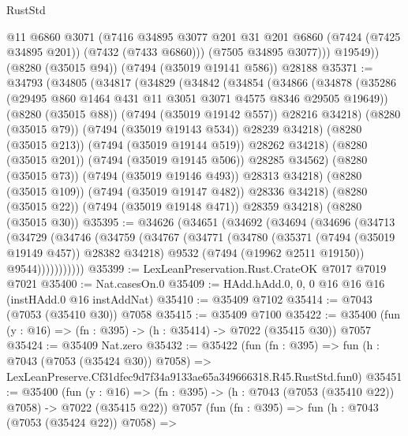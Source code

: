 \begin{lexlean}{RustStd}
\begin{coremodule}
            @11
            @6860
            @3071
            (@7416
              @34895
              @3077
              @201
              @31
              @201
              @6860
              (@7424 (@7425 @34895 @201))
              (@7432 (@7433 @6860)))
            (@7505 @34895 @3077)))
        @19549))
    (@8280 (@35015 @94))
    (@7494 (@35019 @19141 @586))
    @28188
@35371 := @34793
    (@34805
      (@34817
        (@34829
          (@34842
            (@34854
              (@34866
                (@34878
                  (@35286 (@29495 @860 @1464 @431 @11 @3051 @3071 @4575 @8346 @29505 @19649))
                  (@8280 (@35015 @88))
                  (@7494 (@35019 @19142 @557))
                  @28216
                  @34218)
                (@8280 (@35015 @79))
                (@7494 (@35019 @19143 @534))
                @28239
                @34218)
              (@8280 (@35015 @213))
              (@7494 (@35019 @19144 @519))
              @28262
              @34218)
            (@8280 (@35015 @201))
            (@7494 (@35019 @19145 @506))
            @28285
            @34562)
          (@8280 (@35015 @73))
          (@7494 (@35019 @19146 @493))
          @28313
          @34218)
        (@8280 (@35015 @109))
        (@7494 (@35019 @19147 @482))
        @28336
        @34218)
      (@8280 (@35015 @22))
      (@7494 (@35019 @19148 @471))
      @28359
      @34218)
    (@8280 (@35015 @30))
@35395 := @34626
    (@34651
      (@34692
        (@34694
          (@34696
            (@34713
              (@34729
                (@34746
                  (@34759
                    (@34767
                      (@34771
                        (@34780
                          (@35371 (@7494 (@35019 @19149 @457)) @28382 @34218)
                          @9532
                          (@7494 (@19962 @2511 @19150))
                          @9544)))))))))))
@35399 := LexLeanPreservation.Rust.CrateOK @7017 @7019 @7021
@35400 := Nat.casesOn.{0}
@35409 := HAdd.hAdd.{0, 0, 0} @16 @16 @16 (instHAdd.{0} @16 instAddNat)
@35410 := @35409 @7102
@35414 := @7043 (@7053 (@35410 @30)) @7058
@35415 := @35409 @7100
@35422 := @35400 (fun (y : @16) => (fn : @395) -> (h : @35414) -> @7022 (@35415 @30)) @7057
@35424 := @35409 Nat.zero
@35432 := @35422
    (fun (fn : @395) =>
    fun (h : @7043 (@7053 (@35424 @30)) @7058) =>
    LexLeanPreserve.Cf31dfec9d7f34a9133ae65a349666318.R45.RustStd.fun0)
@35451 := @35400
    (fun (y : @16) => (fn : @395) -> (h : @7043 (@7053 (@35410 @22)) @7058) -> @7022 (@35415 @22))
    @7057
    (fun (fn : @395) =>
    fun (h : @7043 (@7053 (@35424 @22)) @7058) =>

\end{coremodule}
\end{lexlean}
